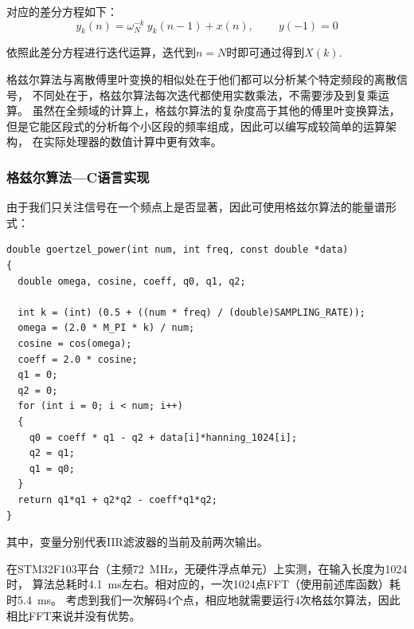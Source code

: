 对应的差分方程如下：
\begin{equation}
  y_{k}(n)=\omega_{N}^{-k}\ y_{k}(n-1)+x(n),\qquad \ y(-1)=0
\end{equation}

依照此差分方程进行迭代运算，迭代到$n=N$时即可通过得到$X(k)$.
\medskip

格兹尔算法与离散傅里叶变换的相似处在于他们都可以分析某个特定频段的离散信号，
不同处在于，格兹尔算法每次迭代都使用实数乘法，不需要涉及到复乘运算。
虽然在全频域的计算上，格兹尔算法的复杂度高于其他的傅里叶变换算法，
但是它能区段式的分析每个小区段的频率组成，因此可以编写成较简单的运算架构，
在实际处理器的数值计算中更有效率。

\subsubsection{格兹尔算法---C语言实现}
由于我们只关注信号在一个频点上是否显著，因此可使用格兹尔算法的能量谱形式：

\begin{verbatim}
double goertzel_power(int num, int freq, const double *data)
{
  double omega, cosine, coeff, q0, q1, q2;

  int k = (int) (0.5 + ((num * freq) / (double)SAMPLING_RATE));
  omega = (2.0 * M_PI * k) / num;
  cosine = cos(omega);
  coeff = 2.0 * cosine;
  q1 = 0;
  q2 = 0;
  for (int i = 0; i < num; i++)
  {
    q0 = coeff * q1 - q2 + data[i]*hanning_1024[i];
    q2 = q1;
    q1 = q0;
  }
  return q1*q1 + q2*q2 - coeff*q1*q2;
}
\end{verbatim}

其中，变量分别代表IIR滤波器的当前及前两次输出。

在STM32F103平台（主频\SI{72}{MHz}，无硬件浮点单元）上实测，在输入长度为1024时，
算法总耗时\SI{4.1}{ms}左右。相对应的，一次1024点FFT（使用前述库函数）耗时\SI{5.4}{ms}。
考虑到我们一次解码4个点，相应地就需要运行4次格兹尔算法，因此相比FFT来说并没有优势。
